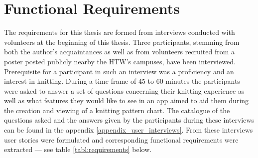 \section{Functional Requirements}

The requirements for this thesis are formed from interviews conducted with volunteers at the beginning of this thesis. Three participants, stemming from both the author's acquaintances as well as from volunteers recruited from a poster posted publicly nearby the HTW’s campuses, have been interviewed. Prerequisite for a participant in such an interview was a proficiency and an interest in knitting. During a time frame of 45 to 60 minutes the participants were asked to answer a set of questions concerning their knitting experience as well as what features they would like to see in an app aimed to aid them during the creation and viewing of a knitting pattern chart. The catalogue of the questions asked and the answers given by the participants during these interviews can be found in the appendix \ref{appendix_user_interviews}. 
From these interviews user stories were formulated and corresponding functional requirements were extracted --- see table \ref{tabl:requirements}  below.

